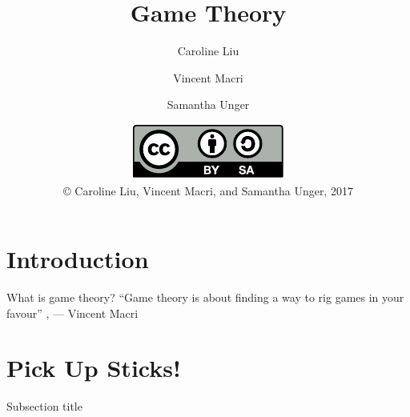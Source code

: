 

\title{Game Theory}
\author{Caroline Liu \and Vincent Macri \and Samantha Unger}
\date{\includegraphics{../LicenseLogo}\\\copyright{} Caroline Liu, Vincent Macri, and Samantha Unger, 2017}


	\frame{\titlepage}
	\section{Introduction}
	\begin{namedframe}{What is game theory?}
		``Game theory is about finding a way to rig games in your favour''
		\sep
		\flushright
		--- Vincent Macri
	\end{namedframe}
	\section{Pick Up Sticks!}
	\begin{namedframe}{Subsection title}
	\end{namedframe}

